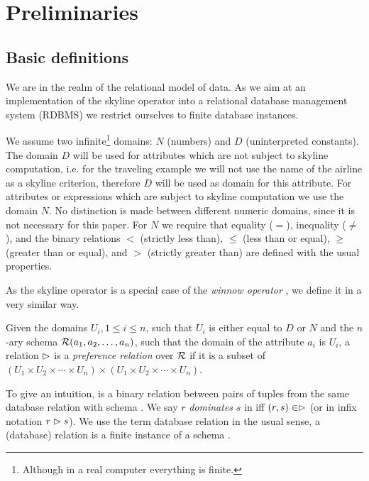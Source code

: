 \chapter{Preliminaries}
\label{chap:preliminaries}

\section{Basic definitions}


We are in the realm of the relational model of
data.  As we aim at an implementation of the skyline operator into a
relational database management system (RDBMS) we restrict ourselves
to finite database instances.

We assume two infinite\footnote{Although in a real computer 
everything is finite.} domains: $N$ (numbers) and $D$ (uninterpreted
constants). The domain $D$ will be used for attributes which are not
subject to skyline computation, i.e. for the traveling example we
will not use the name of the airline as a skyline criterion, therefore
$D$ will be used as domain for this attribute.  For attributes or
expressions which are subject to skyline computation we use the domain
$N$. No distinction is made between different numeric domains, since
it is not necessary for this paper. For $N$ we require that equality
($=$), inequality ($\not=$), and the binary relations $<$ (strictly
less than), $\le$ (less than or equal), $\ge$ (greater than or equal),
and $>$ (strictly greater than) are defined with the usual properties.

As the skyline operator is a special case of the \emph{winnow
operator} \citep{Chomicki2003a}, we define it in a very similar way.

\begin{definition}
Given the domains $U_i, 1 \le i \le n$, such that $U_i$ is either
equal to $D$ or $N$ and the $n$-ary schema $\mathcal{R}(a_1, a_2, \ldots,
a_n)$, such that the domain of the attribute $a_i$ is $U_i$, 
a relation $\vartriangleright$ is a \emph{preference relation} over
$\mathcal{R}$ if it is a subset of $(U_1 \times U_2 \times \cdots \times U_n) \times 
(U_1 \times U_2 \times \cdots \times U_n)$.
\end{definition}

To give an intuition, \dominates is a binary relation between pairs of
tuples from the same database relation  with schema
. We say $r$ \emph{dominates} $s$ in  iff $(r, s)
\in \vartriangleright$ (or in infix notation $r \vartriangleright s$).  We use the
term database relation in the usual sense, a (database) relation
 is a finite instance of a schema .

